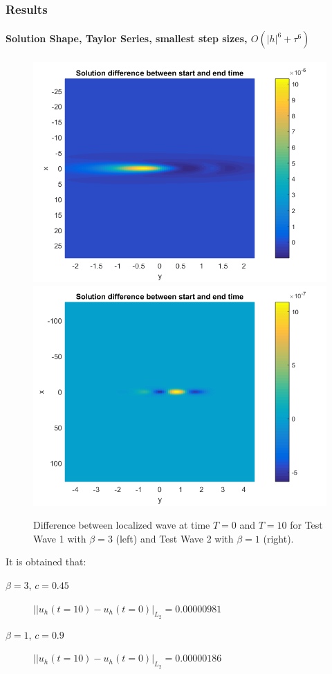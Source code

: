 \documentclass{beamer}
\begin{document}

\begin{frame}
\frametitle{Results}
\framesubtitle{Solution Shape, Taylor Series, smallest step sizes, $O(|h|^6+\tau^6)$}
\begin{figure}[ht]
	\centering
	\begin{minipage}[b]{0.49\linewidth}
		\includegraphics[width=\linewidth]{figures/compare_start_end_bt3_c045_T10.png}
	\end{minipage}	
	\begin{minipage}[b]{0.49\linewidth}
		 \includegraphics[width=\linewidth]{figures/compare_start_end_bt1_c090_T10.png}
	\end{minipage}

Difference between localized wave at time $T=0$ and $T=10$ for Test Wave 1 with $\beta =3$  (left) and Test Wave 2 with $\beta=1$ (right). 
\end{figure}

It is obtained that:
\begin{description}
 \item[$\beta = 3$, $c = 0.45$] $||u_h(t=10)-u_h(t=0)|_{L_2} =  0.00000981$
 \item[$\beta = 1$, $c = 0.9$] $||u_h(t=10)-u_h(t=0)|_{L_2} = 0.00000186$
\end{description}
\end{frame}
\end{document}
